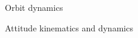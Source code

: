 \begin{section}{Orbit dynamics}

\end{section}
\begin{section}{Attitude kinematics and dynamics}

\end{section}